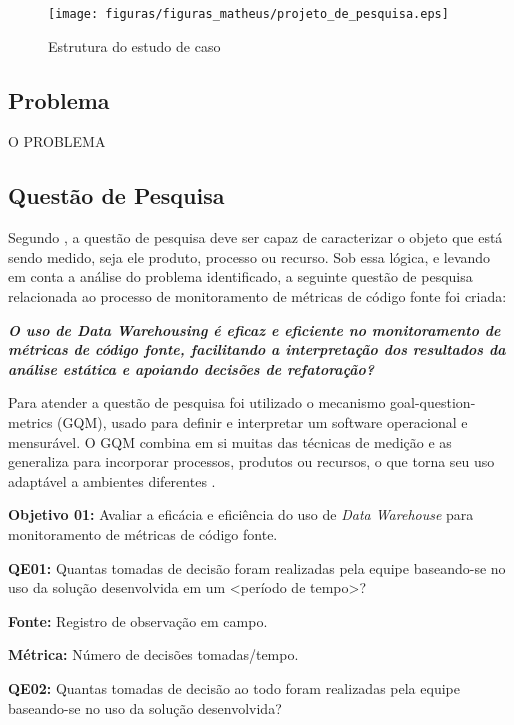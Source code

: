 \begin{figure}[h!]
\centering
\texttt{[image: figuras/figuras\_matheus/projeto\_de\_pesquisa.eps]}
\caption{Estrutura do estudo de caso}
\label{fig:pesquisa}
\end{figure}
\FloatBarrier

\subsection{Problema}

O PROBLEMA 


\subsection{Questão de Pesquisa}

Segundo , a questão de pesquisa deve ser capaz de caracterizar o objeto que está sendo medido, seja ele produto, processo ou recurso. Sob essa lógica, e levando em conta a análise do problema identificado, a seguinte questão de pesquisa relacionada ao processo de monitoramento de métricas de código fonte foi criada:

\textbf{\textit{O uso de \textit{Data Warehousing} é eficaz e eficiente no monitoramento de métricas de código fonte, facilitando a interpretação dos resultados da análise estática e apoiando decisões de refatoração?}}

Para atender a questão de pesquisa foi utilizado o mecanismo goal-question-metrics (GQM), usado para definir e interpretar um software operacional e mensurável. O GQM combina em si muitas das técnicas de medição e as generaliza para incorporar processos, produtos ou recursos, o que torna seu uso adaptável a ambientes diferentes \cite{caldiera_goal_1994}. 


\textbf{Objetivo 01:} Avaliar a eficácia e eficiência do uso de \textit{Data Warehouse} para monitoramento de métricas de código fonte.


\textbf{QE01:} Quantas tomadas de decisão foram realizadas pela equipe baseando-se no uso da solução desenvolvida em um <período de tempo>?

\textbf{Fonte:} Registro de observação em campo.

\textbf{Métrica:} Número de decisões tomadas/tempo.


\textbf{QE02: } Quantas tomadas de decisão ao todo foram realizadas pela equipe baseando-se no uso da solução desenvolvida?

